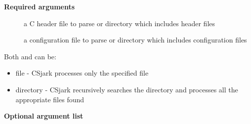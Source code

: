 \documentclass[A4paper,10pt,english]{sphinxmanual}
\begin{document}
\textbf{Required arguments}
\begin{description}
\item[{}] \leavevmode
a C header file to parse or directory which includes header files

\item[{}] \leavevmode
a configuration file to parse or directory which includes configuration files

\end{description}

Both  and  can be:
\begin{itemize}
\item {} 
file - CSjark processes only the specified file

\item {} 
directory - CSjark recursively searches the directory and processes all the appropriate files found

\end{itemize}

\textbf{Optional argument list}
\end{document}

